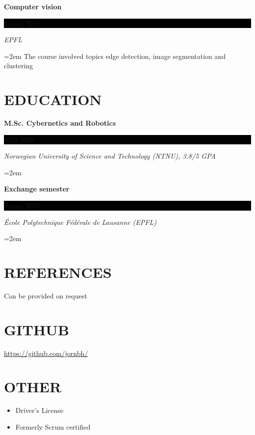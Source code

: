 \documentclass[paper=a4,fontsize=11pt,norsk]{scrartcl} %
\newlength{\spacebox}
\newcommand{\NewPart}[1]{\section*{\uppercase{#1}}}
\newcommand{\PersonalEntry}[2]{
		\noindent\hangindent=2em\hangafter=0 %
		\parbox{\spacebox}{        %
		\textit{#1}}		       %
		\hspace{1.5em} #2 \par}    %
\newcommand{\EducationEntry}[4]{
		\noindent \textbf{#1} \hfill      %
		\colorbox{Black}{%
			\parbox{6em}{%
			\hfill\color{White}#2}} \par  %
		\noindent \textit{#3} \par        %
		\noindent\hangindent=2em\hangafter=0 \small #4 %
		\normalsize \par}
\begin{document}
\EducationEntry{Computer vision}{Spring 2019}{EPFL}
{The course involved topics edge detection, image segmentation and clustering}



\NewPart{Education}{}

\EducationEntry{M.Sc. Cybernetics and Robotics}{2015-2020}{Norwegian University of Science and Technology (NTNU), 3.8/5 GPA}{}
\EducationEntry{Exchange semester}{Spring 2019}{École Polytechnique Fédérale de Lausanne (EPFL)}{}





\NewPart{References}{}
Can be provided on request



\NewPart{GitHub}{}
\url{https://github.com/jornbh/}
\NewPart{Other}{}

\begin{itemize}
\item Driver's License
\item Formerly Scrum certified

\end{itemize}
\end{document}
